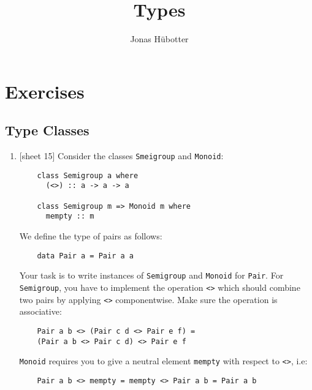 \documentclass{article}
\title{Types}
\author{Jonas Hübotter}
\def\code#1{\texttt{#1}}
\begin{document}
\maketitle

\section{Exercises}

\subsection{Type Classes}
\begin{enumerate}
    \item {[sheet 15]} Consider the classes \code{Smeigroup} and \code{Monoid}:
        \begin{verbatim}
    class Semigroup a where
      (<>) :: a -> a -> a

    class Semigroup m => Monoid m where
      mempty :: m
        \end{verbatim}
        We define the type of pairs as follows:
        \begin{verbatim}
    data Pair a = Pair a a
        \end{verbatim}
        Your task is to write instances of \code{Semigroup} and \code{Monoid} for \code{Pair}. For \code{Semigroup}, you have to implement the operation \code{<>} which should combine two pairs by applying \code{<>} componentwise. Make sure the operation is associative:
        \begin{verbatim}
    Pair a b <> (Pair c d <> Pair e f) =
    (Pair a b <> Pair c d) <> Pair e f
        \end{verbatim}
        \code{Monoid} requires you to give a neutral element \code{mempty} with respect to \code{<>}, i.e:
        \begin{verbatim}
    Pair a b <> mempty = mempty <> Pair a b = Pair a b
        \end{verbatim}


\end{enumerate}
\end{document}
